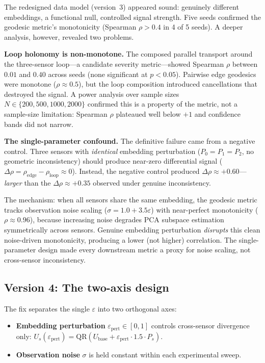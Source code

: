 \documentclass[11pt]{article}
\newcommand{\eps}{\varepsilon}
\newcommand{\epspert}{\eps_\mathrm{pert}}
\begin{document}
The redesigned data model (version~3) appeared sound: genuinely
different embeddings, a functional null, controlled signal
strength.  Five seeds confirmed the geodesic metric's monotonicity
(Spearman $\rho > 0.4$ in 4 of 5 seeds).  A deeper analysis,
however, revealed two problems.

\textbf{Loop holonomy is non-monotone.}  The composed parallel
transport around the three-sensor loop---a candidate severity
metric---showed Spearman $\rho$ between $0.01$ and $0.40$ across
seeds (none significant at $p < 0.05$).  Pairwise edge geodesics
were monotone ($\rho \approx 0.5$), but the loop composition
introduced cancellations that destroyed the signal.  A power
analysis over sample sizes $N \in \{200, 500, 1000, 2000\}$
confirmed this is a property of the metric, not a sample-size
limitation: Spearman $\rho$ plateaued well below $+1$ and
confidence bands did not narrow.

\textbf{The single-parameter confound.}  The definitive failure
came from a negative control.  Three sensors with \emph{identical}
embedding perturbation ($P_0 = P_1 = P_2$, no geometric
inconsistency) should produce near-zero differential signal
($\Delta\rho = \rho_\mathrm{edge} - \rho_\mathrm{loop} \approx
0$).  Instead, the negative control produced $\Delta\rho \approx
+0.60$---\emph{larger} than the $\Delta\rho \approx +0.35$
observed under genuine inconsistency.

The mechanism: when all sensors share the same embedding, the
geodesic metric tracks observation noise scaling ($\sigma = 1.0 +
3.5\eps$) with near-perfect monotonicity ($\rho \approx 0.96$),
because increasing noise degrades PCA subspace estimation
symmetrically across sensors.  Genuine embedding perturbation
\emph{disrupts} this clean noise-driven monotonicity, producing a
lower (not higher) correlation.  The single-parameter design made
every downstream metric a proxy for noise scaling, not cross-sensor
inconsistency.

\subsection{Version 4: The two-axis design}
\label{sec:v4}

The fix separates the single $\eps$ into two orthogonal axes:

\begin{itemize}
  \item \textbf{Embedding perturbation} $\epspert \in [0, 1]$
    controls cross-sensor divergence only: $U_s(\epspert) =
    \mathrm{QR}(U_\mathrm{base} + \epspert \cdot 1.5 \cdot P_s)$.
  \item \textbf{Observation noise} $\sigma$ is held constant within
    each experimental sweep.
\end{itemize}
\end{document}
